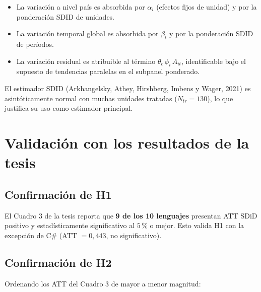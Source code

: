 \documentclass[11pt,a4paper]{article}
\theoremstyle{definition}
\begin{document}
\begin{itemize}[leftmargin=*]
  \item La variación a nivel país es absorbida por $\alpha_i$ (efectos fijos de unidad) y por la ponderación SDID de unidades.
  \item La variación temporal global es absorbida por $\beta_t$ y por la ponderación SDID de períodos.
  \item La variación residual es atribuible al término $\theta_c \,\phi_i\, A_{it}$, identificable bajo el supuesto de tendencias paralelas en el subpanel ponderado.
\end{itemize}

El estimador SDID (Arkhangelsky, Athey, Hirshberg, Imbens y Wager, 2021) es asintóticamente normal con muchas unidades tratadas ($N_{tr} = 130$), lo que justifica su uso como estimador principal.

\section{Validación con los resultados de la tesis}

\subsection{Confirmación de H1}

El Cuadro 3 de la tesis reporta que \textbf{9 de los 10 lenguajes} presentan ATT SDiD positivo y estadísticamente significativo al $5\,\%$ o mejor. Esto valida H1 con la excepción de C\# (ATT $= 0{,}443$, no significativo).

\subsection{Confirmación de H2}

Ordenando los ATT del Cuadro 3 de mayor a menor magnitud:
\end{document}
